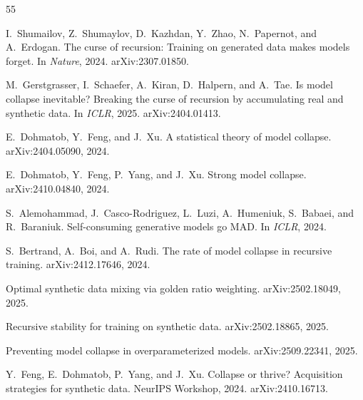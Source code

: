 \documentclass[11pt]{article}
\begin{document}


\begin{thebibliography}{55}

I.~Shumailov, Z.~Shumaylov, D.~Kazhdan, Y.~Zhao, N.~Papernot, and A.~Erdogan.
\newblock The curse of recursion: Training on generated data makes models forget.
\newblock In \textit{Nature}, 2024. arXiv:2307.01850.

M.~Gerstgrasser, I.~Schaefer, A.~Kiran, D.~Halpern, and A.~Tae.
\newblock Is model collapse inevitable? Breaking the curse of recursion by accumulating real and synthetic data.
\newblock In \textit{ICLR}, 2025. arXiv:2404.01413.

E.~Dohmatob, Y.~Feng, and J.~Xu.
\newblock A statistical theory of model collapse.
\newblock arXiv:2404.05090, 2024.

E.~Dohmatob, Y.~Feng, P.~Yang, and J.~Xu.
\newblock Strong model collapse.
\newblock arXiv:2410.04840, 2024.

S.~Alemohammad, J.~Casco-Rodriguez, L.~Luzi, A.~Humeniuk, S.~Babaei, and R.~Baraniuk.
\newblock Self-consuming generative models go MAD.
\newblock In \textit{ICLR}, 2024.

S.~Bertrand, A.~Boi, and A.~Rudi.
\newblock The rate of model collapse in recursive training.
\newblock arXiv:2412.17646, 2024.

Optimal synthetic data mixing via golden ratio weighting.
\newblock arXiv:2502.18049, 2025.

Recursive stability for training on synthetic data.
\newblock arXiv:2502.18865, 2025.

Preventing model collapse in overparameterized models.
\newblock arXiv:2509.22341, 2025.

Y.~Feng, E.~Dohmatob, P.~Yang, and J.~Xu.
\newblock Collapse or thrive? Acquisition strategies for synthetic data.
\newblock NeurIPS Workshop, 2024. arXiv:2410.16713.


\end{thebibliography}
\end{document}
